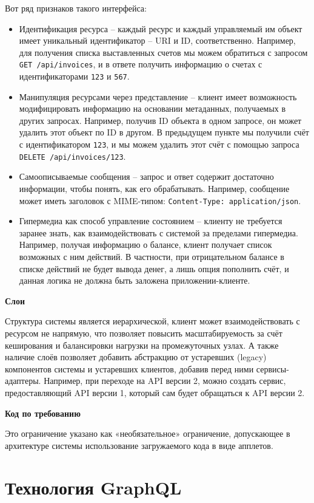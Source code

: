 Вот ряд признаков такого интерфейса:
\begin{itemize}
	\item Идентификация ресурса – каждый ресурс и каждый управляемый им объект имеет уникальный идентификатор – URI и ID, соответственно.
	Например, для получения списка выставленных счетов мы можем обратиться с запросом \texttt{GET /api/invoices}, и в ответе получить информацию о счетах с идентификаторами \texttt{123} и \texttt{567}.
	\item Манипуляция ресурсами через представление – клиент имеет возможность модифицировать информацию на основании метаданных, получаемых в других запросах.
	Например, получив ID объекта в одном запросе, он может удалить этот объект по ID в другом.
	В предыдущем пункте мы получили счёт с идентификатором \texttt{123}, и мы можем удалить этот счёт с помощью запроса \texttt{DELETE /api/invoices/123}.
	\item Самоописываемые сообщения – запрос и ответ содержит достаточно информации, чтобы понять, как его обрабатывать.
	Например, сообщение может иметь заголовок с MIME-типом: \texttt{Content-Type: application/json}.
	\item Гипермедиа как способ управление состоянием – клиенту не требуется заранее знать, как взаимодействовать с системой за пределами гипермедиа.
	Например, получая информацию о балансе, клиент получает список возможных с ним действий.
	В частности, при отрицательном балансе в списке действий не будет вывода денег, а лишь опция пополнить счёт, и данная логика не должна быть заложена приложении-клиенте.
\end{itemize}

\textbf{Слои}

Структура системы является иерархической, клиент может взаимодействовать с ресурсом не напрямую, что позволяет повысить масштабируемость за счёт кеширования и балансировки нагрузки на промежуточных узлах.
А также наличие слоёв позволяет добавить абстракцию от устаревших (legacy) компонентов системы и устаревших клиентов, добавив перед ними сервисы-адаптеры.
Например, при переходе на API версии 2, можно создать сервис, предоставляющий API версии 1, который сам будет обращаться к API версии 2.

\textbf{Код по требованию}

Это ограничение указано как «необязательное» ограничение, допускающее в архитектуре системы использование загружаемого кода в виде апплетов.


\section{Технология GraphQL}\label{sec:graphql}

